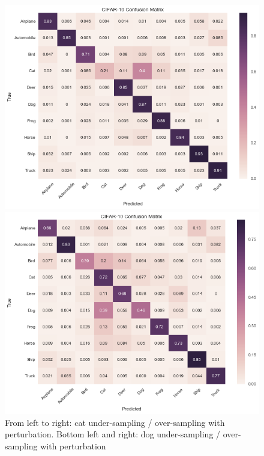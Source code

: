 \documentclass[runningheads,a4paper]{llncs}
\begin{document}
\begin{figure}
	\begin{minipage}[b]{0.55\linewidth}
		\centering
		\includegraphics[width=1\linewidth]{cat_undersampling_per.png} 
	\end{minipage}%
	\begin{minipage}[b]{0.55\linewidth}
		\centering
		\includegraphics[width=1\linewidth]{cat_oversampling_per.png} 
	\end{minipage}
	\centering
	\caption{From left to right: cat under-sampling / over-sampling with perturbation. Bottom left and right: dog under-sampling / over-sampling with perturbation}
	\label{fig:overlap}
\end{figure}
\end{document}
